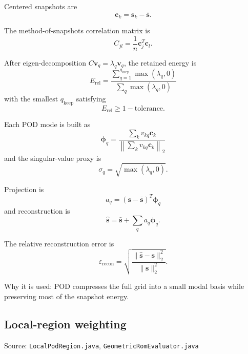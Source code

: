 \documentclass[11pt]{article}
\begin{document}
Centered snapshots are
\begin{equation*}
\mathbf c_k = \mathbf s_k - \bar{\mathbf s}.
\end{equation*}

The method-of-snapshots correlation matrix is
\begin{equation*}
C_{jl} = \frac{1}{n}\mathbf c_j^T\mathbf c_l.
\end{equation*}

After eigen-decomposition $C\mathbf v_q=\lambda_q\mathbf v_q$, the retained energy is
\begin{equation*}
E_{\mathrm{rel}} = \frac{\sum_{q=1}^{q_{\mathrm{keep}}}\max(\lambda_q,0)}{\sum_q \max(\lambda_q,0)}
\end{equation*}
with the smallest $q_{\mathrm{keep}}$ satisfying
\begin{equation*}
E_{\mathrm{rel}} \ge 1 - \text{tolerance}.
\end{equation*}

Each POD mode is built as
\begin{equation*}
\boldsymbol{\phi}_q = \frac{\sum_k v_{kq}\mathbf c_k}{\left\|\sum_k v_{kq}\mathbf c_k\right\|_2}
\end{equation*}
and the singular-value proxy is
\begin{equation*}
\sigma_q = \sqrt{\max(\lambda_q,0)}.
\end{equation*}

Projection is
\begin{equation*}
a_q = (\mathbf s-\bar{\mathbf s})^T\boldsymbol{\phi}_q
\end{equation*}
and reconstruction is
\begin{equation*}
\hat{\mathbf s} = \bar{\mathbf s} + \sum_q a_q\boldsymbol{\phi}_q.
\end{equation*}

The relative reconstruction error is
\begin{equation*}
\varepsilon_{\mathrm{recon}} = \sqrt{\frac{\|\hat{\mathbf s}-\mathbf s\|_2^2}{\|\mathbf s\|_2^2}}.
\end{equation*}

Why it is used: POD compresses the full grid into a small modal basis while preserving most of the snapshot energy.

\subsection{Local-region weighting}
Source: \texttt{LocalPodRegion.java}, \texttt{GeometricRomEvaluator.java}
\end{document}
